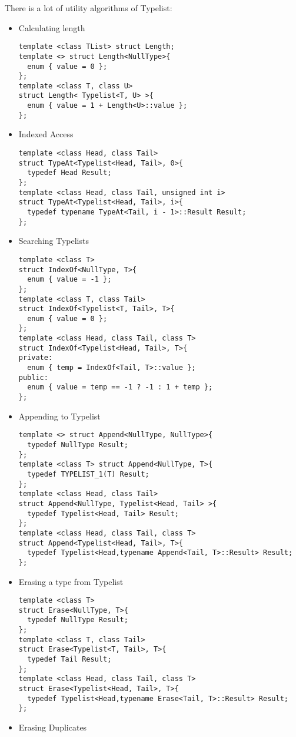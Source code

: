 There is a lot of utility algorithms of Typelist:
\begin{itemize}
\item Calculating length
\begin{verbatim}
template <class TList> struct Length;
template <> struct Length<NullType>{
  enum { value = 0 };
};
template <class T, class U>
struct Length< Typelist<T, U> >{
  enum { value = 1 + Length<U>::value };
};
\end{verbatim}
\item  Indexed Access
\begin{verbatim}
template <class Head, class Tail>
struct TypeAt<Typelist<Head, Tail>, 0>{
  typedef Head Result;
};
template <class Head, class Tail, unsigned int i>
struct TypeAt<Typelist<Head, Tail>, i>{
  typedef typename TypeAt<Tail, i - 1>::Result Result;
};
\end{verbatim}
\item Searching Typelists
\begin{verbatim}
template <class T>
struct IndexOf<NullType, T>{
  enum { value = -1 };
};
template <class T, class Tail>
struct IndexOf<Typelist<T, Tail>, T>{
  enum { value = 0 };
};
template <class Head, class Tail, class T>
struct IndexOf<Typelist<Head, Tail>, T>{
private:
  enum { temp = IndexOf<Tail, T>::value };
public:
  enum { value = temp == -1 ? -1 : 1 + temp };
};
\end{verbatim}
\item Appending to Typelist
\begin{verbatim}
template <> struct Append<NullType, NullType>{
  typedef NullType Result;
};
template <class T> struct Append<NullType, T>{
  typedef TYPELIST_1(T) Result;
};
template <class Head, class Tail>
struct Append<NullType, Typelist<Head, Tail> >{
  typedef Typelist<Head, Tail> Result;
};
template <class Head, class Tail, class T>
struct Append<Typelist<Head, Tail>, T>{
  typedef Typelist<Head,typename Append<Tail, T>::Result> Result;
};
\end{verbatim}
\item Erasing a type from Typelist
\begin{verbatim}
template <class T>
struct Erase<NullType, T>{
  typedef NullType Result;
};
template <class T, class Tail>
struct Erase<Typelist<T, Tail>, T>{
  typedef Tail Result;
};
template <class Head, class Tail, class T>
struct Erase<Typelist<Head, Tail>, T>{
  typedef Typelist<Head,typename Erase<Tail, T>::Result> Result;
};
\end{verbatim}
\item Erasing Duplicates

\end{itemize}
